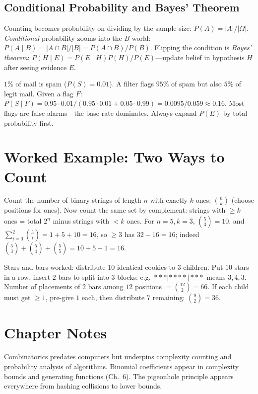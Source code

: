 \subsection{Conditional Probability and Bayes' Theorem}
\label{sec:bayes}
Counting becomes probability on dividing by the sample size: $P(A)=|A|/|\Omega|$. \emph{Conditional} probability zooms into the $B$-world: $P(A\mid B)=|A\cap B|/|B|=P(A\cap B)/P(B)$. Flipping the condition is \emph{Bayes' theorem}: $P(H\mid E)=P(E\mid H)P(H)/P(E)$---update belief in hypothesis $H$ after seeing evidence $E$.
\begin{example}
$1\%$ of mail is spam ($P(S)=0.01$). A filter flags $95\%$ of spam but also $5\%$ of legit mail. Given a flag $F$: $P(S\mid F)=0.95\cdot0.01/(0.95\cdot0.01+0.05\cdot0.99)=0.0095/0.059\approx0.16$. Most flags are false alarms---the base rate dominates. Always expand $P(E)$ by total probability first.
\end{example}

\section{Worked Example: Two Ways to Count}
Count the number of binary strings of length $n$ with exactly $k$ ones: $\binom{n}{k}$ (choose positions for ones). Now count the same set by complement: strings with $\ge k$ ones = total $2^n$ minus strings with $<k$ ones. For $n=5,k=3$, $\binom{5}{3}=10$, and $\sum_{i=0}^{2}\binom{5}{i}=1+5+10=16$, so $\ge3$ has $32-16=16$; indeed $\binom{5}{3}+\binom{5}{4}+\binom{5}{5}=10+5+1=16$.

Stars and bars worked: distribute $10$ identical cookies to $3$ children. Put $10$ stars in a row, insert $2$ bars to split into $3$ blocks: e.g.\ $***|****|***$ means $3,4,3$. Number of placements of $2$ bars among $12$ positions $=\binom{12}{2}=66$. If each child must get $\ge1$, pre-give $1$ each, then distribute $7$ remaining: $\binom{9}{2}=36$.

\section{Chapter Notes}
Combinatorics predates computers but underpins complexity counting and probability analysis of algorithms. Binomial coefficients appear in complexity bounds and generating functions (Ch.~6). The pigeonhole principle appears everywhere from hashing collisions to lower bounds.

